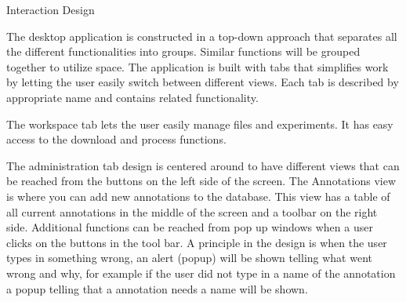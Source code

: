 {\huge Interaction Design}

The desktop application is constructed in a top-down approach that separates all the different functionalities into groups. Similar functions will be grouped together to utilize space.
The application is built with tabs that simplifies work by letting the user easily switch between different views. Each tab is described by appropriate name and contains related functionality.

The workspace tab lets the user easily manage files and experiments. It has easy access to the download and process functions.

The administration tab design is centered around to have different views that can be reached from the buttons on the left side of the screen. The Annotations view is where you can add new annotations to the database. This view has a table of all current annotations in the middle of the screen and a toolbar on the right side. Additional functions can be reached from pop up windows when a user clicks on the buttons in the tool bar.
A principle in the design is when the user types in something wrong, an alert (popup) will be shown telling what went wrong and why, for example if the user did not type in a name of the annotation a popup telling that a annotation needs a name will be shown.
\FloatBarrier
